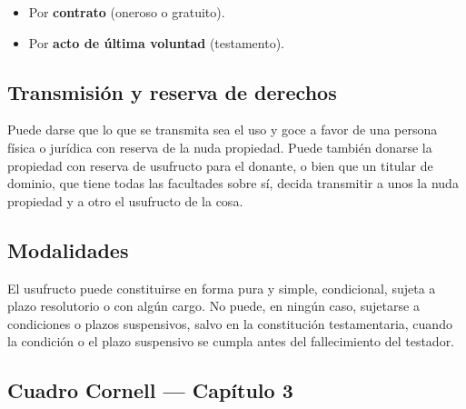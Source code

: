 \documentclass[12pt,oneside]{book}
\begin{document}
\begin{itemize}
    \item Por \textbf{contrato} (oneroso o gratuito).
    \item Por \textbf{acto de última voluntad} (testamento).
\end{itemize}

\subsection{Transmisión y reserva de derechos}

Puede darse que lo que se transmita sea el uso y goce a favor de una persona física o jurídica con reserva de la nuda propiedad. Puede también donarse la propiedad con reserva de usufructo para el donante, o bien que un titular de dominio, que tiene todas las facultades sobre sí, decida transmitir a unos la nuda propiedad y a otro el usufructo de la cosa.

\subsection{Modalidades}

El usufructo puede constituirse en forma pura y simple, condicional, sujeta a plazo resolutorio o con algún cargo. No puede, en ningún caso, sujetarse a condiciones o plazos suspensivos, salvo en la constitución testamentaria, cuando la condición o el plazo suspensivo se cumpla antes del fallecimiento del testador.

\subsection*{Cuadro Cornell --- Capítulo 3}
\end{document}
